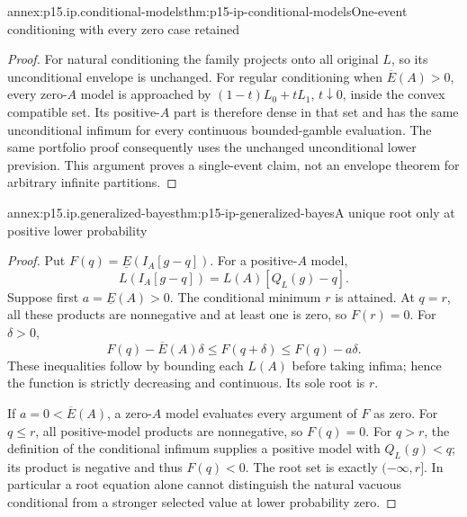 \begin{annexitem}{annex:p15.ip.conditional-models}{thm:p15-ip-conditional-models}{One-event conditioning with every zero case retained}
\begin{proof}
For natural conditioning the family projects onto all original \(L\),
so its unconditional envelope is unchanged. For regular conditioning
when \(\overline E(A)>0\), every zero-\(A\) model is approached by
\((1-t)L_0+tL_1\), \(t\downarrow0\), inside the convex compatible
set. Its positive-\(A\) part is therefore dense in that set and has
the same unconditional infimum for every continuous bounded-gamble
evaluation. The same portfolio proof consequently uses the unchanged
unconditional lower prevision. This argument proves a single-event
claim, not an envelope theorem for arbitrary infinite partitions.
\end{proof}
\end{annexitem}

\begin{annexitem}{annex:p15.ip.generalized-bayes}{thm:p15-ip-generalized-bayes}{A unique root only at positive lower probability}
\begin{proof}
Put \(F(q)=\underline E(I_A[g-q])\). For a positive-\(A\) model,
\[
 L(I_A[g-q])=L(A)[Q_L(g)-q].
\]
Suppose first \(a=\underline E(A)>0\). The conditional minimum
\(r\) is attained. At \(q=r\), all these products are nonnegative
and at least one is zero, so \(F(r)=0\). For \(\delta>0\),
\[
 F(q)-\overline E(A)\delta
       \leq F(q+\delta)\leq F(q)-a\delta.
\]
These inequalities follow by bounding each \(L(A)\) before taking
infima; hence the function is strictly decreasing and continuous.
Its sole root is \(r\).

If \(a=0<\overline E(A)\), a zero-\(A\) model evaluates every
argument of \(F\) as zero. For \(q\leq r\), all positive-model
products are nonnegative, so \(F(q)=0\). For \(q>r\), the
definition of the conditional infimum supplies a positive model with
\(Q_L(g)<q\); its product is negative and thus \(F(q)<0\).
The root set is exactly \(( -\infty,r]\). In particular a root
equation alone cannot distinguish the natural vacuous conditional
from a stronger selected value at lower probability zero.
\end{proof}
\end{annexitem}

